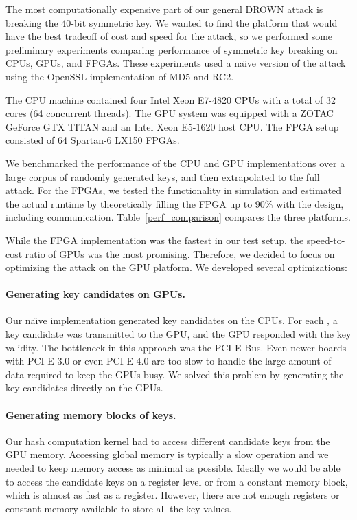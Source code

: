 \label{sec:gpu}

\GPUTable

The most computationally expensive part of our general DROWN attack is breaking the 40-bit symmetric key.  We wanted to find the platform that would have the best tradeoff of cost and speed for the attack, so we performed some preliminary experiments comparing performance of symmetric key breaking on CPUs, GPUs, and FPGAs.  These experiments used a na\"{\i}ve version of the attack using the OpenSSL implementation of MD5 and RC2.

The CPU machine contained four Intel Xeon E7-4820 CPUs with a total of 32 cores (64 concurrent threads). The GPU system was equipped with a ZOTAC GeForce GTX TITAN and an Intel Xeon E5-1620 host CPU\@. The FPGA setup consisted of 64 Spartan-6 LX150 FPGAs.

We benchmarked the performance of the CPU and GPU implementations over a large corpus of randomly generated keys, and then extrapolated to the full attack.
For the FPGAs, we tested the functionality in simulation and estimated the actual runtime by theoretically filling the FPGA up to 90\% with the design, including communication.
Table~\ref{perf_comparison} compares the three platforms.

While the FPGA implementation was the fastest in our test setup, the speed-to-cost ratio of GPUs was the most promising. Therefore, we decided to focus on optimizing the attack on the GPU platform.
We developed several optimizations:

\paragraph{Generating key candidates on GPUs.} Our na\"{\i}ve implementation generated key candidates on the CPUs. For each \hashcomputation, a key candidate was transmitted to the GPU, and the GPU responded with the key validity. The bottleneck in this approach was the PCI-E Bus. Even newer boards with PCI-E 3.0 or even PCI-E 4.0 are too slow to handle the large amount of data required to keep the GPUs busy. We solved this problem by generating the key candidates directly on the GPUs.
	
\paragraph{Generating memory blocks of keys.}
Our hash computation kernel had to access different candidate keys from the GPU memory. Accessing global memory is typically a slow operation and we needed to keep memory access as minimal as possible. Ideally we would be able to access the candidate keys on a register level or from a constant memory block, which is almost as fast as a register. However, there are not enough registers or constant memory available to store all the key values. 

